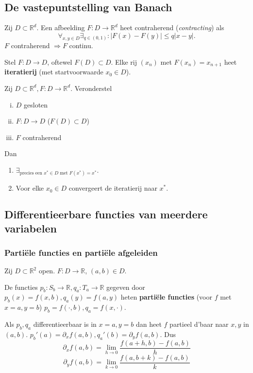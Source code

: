 \documentclass[a4paper]{exam}
\theoremstyle{definition}
\begin{document}
		\subsection{De vastepuntstelling van Banach}
			Zij $D \subset \mathbb{R}^d$. Een afbeelding $F:D \rightarrow \mathbb{R}^d$ heet contraherend (\textit{contracting}) als
			\[\forall _{x,y\in D}\exists _{q \in (0,1)}:|F(x)-F(y)| \leq q|x-y|. \]
			\opm $F$ contraherend $\Rightarrow F$ continu.
			
			Stel $F:D\rightarrow D$, oftewel $F(D) \subset D$. Elke rij $(x_n)$ met $F(x_n) = x_{n+1}$ heet \textbf{iteratierij} (met startvoorwaarde $x_0 \in D$).
			
			Zij $D \subset \mathbb{R}^d, F:D\rightarrow \mathbb{R}^d$. Veronderstel
			\begin{enumerate}[(i)]
				\item $D$ gesloten
				\item $F:D \rightarrow D$ ($F(D) \subset D$)
				\item $F$ contraherend
			\end{enumerate}
			Dan
			\begin{enumerate}[(1)]
				\item $\exists _{\text{precies een } x^* \in D \text{ met } F(x^*)=x^*}$.
				\item Voor elke $x_0 \in D$ convergeert de iteratierij naar $x^*$.
			\end{enumerate}
		
		\subsection{Differentieerbare functies van meerdere variabelen}
		\subsubsection{Parti\"ele functies en parti\"ele afgeleiden}
			Zij $D \subset \mathbb{R}^2$ open. $F:D \rightarrow \mathbb{R}$, $(a,b) \in D$.
			
			De functies $p_b:S_b \rightarrow \mathbb{R}, q_a:T_a \rightarrow \mathbb{R}$ gegeven door $p_b(x)=f(x,b), q_a(y)=f(a,y)$ heten \textbf{parti\"ele functies} (voor $f$ met $x=a, y=b$)
			\nota $p_b=f(\cdot, b), q_a=f(x,\cdot)$.
			
			Als $p_b, q_a$ differentieerbaar is in $x=a,y=b$ dan heet $f$ partieel d'baar naar $x,y$ in $(a,b)$.
			\nota $p_b'(a)=\partial_x f(a,b), q_a'(b)=\partial_y f(a,b)$. Dus \[\partial_x f(a,b)=\lim_{h \rightarrow 0} \frac{f(a+h,b)-f(a,b)}{h}\]\[\partial_y f(a,b)=\lim_{k \rightarrow 0} \frac{f(a,b+k)-f(a,b)}{k}\]
\end{document}
